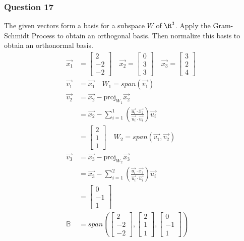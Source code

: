 \documentclass{math}
\begin{document}
\subsubsection*{Question 17}
The given vectors form a basis for a subspace \( W \) of \( \R^3 \). Apply the
Gram-Schmidt Process to obtain an orthogonal basis. Then normalize this basis
to obtain an orthonormal basis.
\begin{align*}
  \vec{x_1} &= \begin{bmatrix}2 \\ -2 \\ -2\end{bmatrix} \quad
    \vec{x_2} = \begin{bmatrix}0 \\ 3 \\ 3\end{bmatrix} \quad
    \vec{x_3} = \begin{bmatrix}3 \\ 2 \\ 4\end{bmatrix} \\
  \vec{v_1} &= \vec{x_1} \quad W_1 = span(\vec{v_1}) \\
  \vec{v_2} &= \vec{x_2}-\text{proj}_{W_1}\vec{x_2} \\
  &= \vec{x_2}-\sum_{i=1}^{1}
    \left(\frac{\vec{u_i}\cdot\vec{x_2}}{\vec{u_i}\cdot\vec{u_i}}\right)
    \vec{u_i} \\
  &= \begin{bmatrix}2 \\ 1 \\ 1\end{bmatrix} \quad
    W_2 = span(\vec{v_1},\vec{v_2}) \\
  \vec{v_3} &= \vec{x_3}-\text{proj}_{W_2}\vec{x_3} \\
  &= \vec{x_3}-\sum_{i=1}^{2}
    \left(\frac{\vec{u_i}\cdot\vec{x_3}}{\vec{u_i}\cdot\vec{u_i}}\right)
    \vec{u_i} \\
  &= \begin{bmatrix}0 \\ -1 \\ 1\end{bmatrix} \\
  \mathbb{B} &= span\left(
    \begin{bmatrix}2 \\ -2 \\ -2\end{bmatrix},
    \begin{bmatrix}2 \\ 1 \\ 1\end{bmatrix},
    \begin{bmatrix}0 \\ -1 \\ 1\end{bmatrix}
  \right)
\end{align*}
\end{document}
